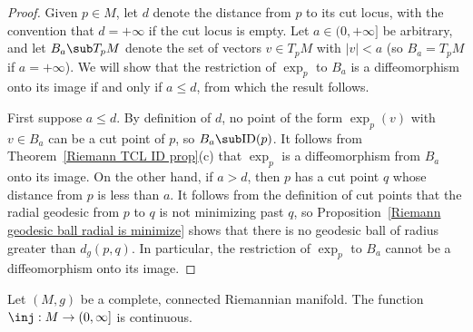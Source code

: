 \begin{proof}
Given $p\in M$, let $d$ denote the distance from $p$ to its cut locus, with the convention that $d=+\infty$ if the cut locus is empty. Let $a\in(0,+\infty]$ be arbitrary, and let $B_a\sub T_pM$ denote the set of vectors $v\in T_pM$ with $|v|<a$ (so $B_a=T_pM$ if $a=+\infty$). We will show that the restriction of $\exp_p$ to $B_a$ is a diffeomorphism onto its image if and only if $a\leq d$, from which the result follows.\par
First suppose $a\leq d$. By definition of $d$, no point of the form $\exp_p(v)$ with $v\in B_a$ can be a cut point of $p$, so $B_a\sub\mathrm{ID}(p)$. It follows from 
Theorem~\ref{Riemann TCL ID prop}(c) that $\exp_p$ is a diffeomorphism from $B_a$ onto its image. On the other hand, if $a>d$, then $p$ has a cut point $q$ whose 
distance from $p$ is less than $a$. It follows from the definition of cut points that the radial geodesic from $p$ to $q$ is not minimizing past $q$, so 
Proposition~\ref{Riemann geodesic ball radial is minimize} shows that there is no geodesic ball of radius greater than $d_g(p,q)$. In particular, the restriction of 
$\exp_p$ to $B_a$ cannot be a diffeomorphism onto its image.
\end{proof}
\begin{proposition}
Let $(M,g)$ be a complete, connected Riemannian manifold. The function $\inj:M\to(0,\infty]$ is continuous.
\end{proposition}
